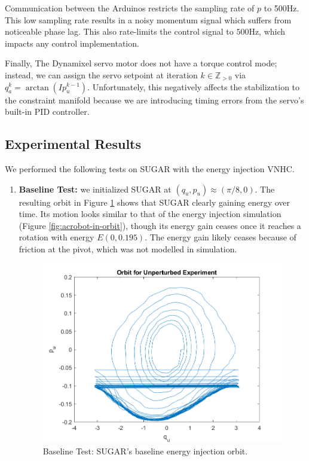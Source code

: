 \documentclass[journal,twoside,onecolumn,draftclsnofoot,web]{ieeecolor}
\begin{document}
{Communication between the Arduinos restricts the sampling rate of \(p\) to
500Hz.
This low sampling rate results in a noisy momentum signal which suffers
from noticeable phase lag.
This also rate-limits the control signal to \(500\)Hz, which impacts any control
implementation.

Finally, The Dynamixel servo motor does not have a torque control mode; instead,
we can assign the servo setpoint at iteration \(k \in \mathbb{Z}_{> 0}\)
via \(q_a^{k} = \arctan(I p_u^{k-1})\).
Unfortunately, this negatively affects the stabilization to the constraint
manifold because we are introducing timing errors from the servo's built-in PID
controller.

\subsection{Experimental Results}

We performed the following tests on SUGAR with the energy injection VNHC.

\begin{enumerate}
    \item \textbf{Baseline Test:} 
    we initialized SUGAR at 
    \((q_u,p_u) \approx \left(\pi/8,0\right)\). 
    The resulting orbit in Figure \ref{fig:acrobot-unperturbed-orbit} shows
    that SUGAR clearly gaining energy over time.
    Its motion looks similar to that of the energy injection simulation (Figure
    \ref{fig:acrobot-in-orbit}), though its energy gain ceases once it reaches a
    rotation with energy \(E(0,0.195)\).
    The energy gain likely ceases because of friction at the pivot, which was
    not modelled in simulation.

\begin{figure}
    \centering
    \includegraphics[width=0.8\linewidth]{acrobot_unperturbed_orbit.png}
    \caption{Baseline Test: SUGAR's baseline energy injection orbit.}
    \label{fig:acrobot-unperturbed-orbit}
\end{figure}


\end{enumerate}}
\end{document}
